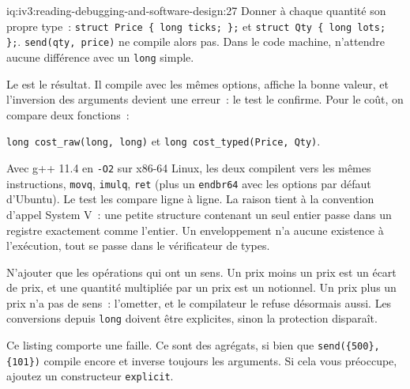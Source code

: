 \begin{solution}{iq:iv3:reading-debugging-and-software-design:27}
Donner à chaque quantité son propre type~: \texttt{struct Price \{ long ticks; \};} et \texttt{struct Qty \{ long lots; \};}. \texttt{send(qty, price)} ne compile alors pas. Dans le code machine, n'attendre aucune différence avec un \texttt{long} simple.

Le  est le résultat. Il compile avec les mêmes options, affiche la bonne valeur, et l'inversion des arguments devient une erreur~: le test le confirme. Pour le coût, on compare deux fonctions~:

\texttt{long cost\_raw(long, long)} et \texttt{long cost\_typed(Price, Qty)}.

Avec g++ 11.4 en \texttt{-O2} sur x86-64 Linux, les deux compilent vers les mêmes instructions, \texttt{movq}, \texttt{imulq}, \texttt{ret} (plus un \texttt{endbr64} avec les options par défaut d'Ubuntu). Le test les compare ligne à ligne. La raison tient à la convention d'appel System V~: une petite structure contenant un seul entier passe dans un registre exactement comme l'entier. Un enveloppement n'a aucune existence à l'exécution, tout se passe dans le vérificateur de types.

N'ajouter que les opérations qui ont un sens. Un prix moins un prix est un écart de prix, et une quantité multipliée par un prix est un notionnel. Un prix plus un prix n'a pas de sens~: l'ometter, et le compilateur le refuse désormais aussi. Les conversions depuis \texttt{long} doivent être explicites, sinon la protection disparaît.

Ce listing comporte une faille. Ce sont des agrégats, si bien que \texttt{send(\{500\}, \{101\})} compile encore et inverse toujours les arguments. Si cela vous préoccupe, ajoutez un constructeur \texttt{explicit}.

\label{lst:iv3:rd:strong}


\end{solution}

